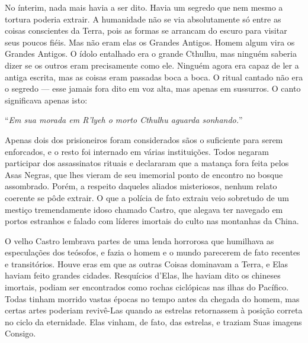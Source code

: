 No ínterim, nada mais havia a ser dito. Havia um segredo que nem mesmo a
tortura poderia extrair. A humanidade não se via absolutamente só entre
as coisas conscientes da Terra, pois as formas se arrancam do escuro
para visitar seus poucos fiéis. Mas não eram elas os Grandes Antigos.
Homem algum vira os Grandes Antigos. O ídolo entalhado era o grande
Cthulhu, mas ninguém saberia dizer se os outros eram precisamente como
ele. Ninguém agora era capaz de ler a antiga escrita, mas as coisas eram
passadas boca a boca. O ritual cantado não era o segredo --- esse jamais
fora dito em voz alta, mas apenas em sussurros. O canto significava
apenas isto:

``\emph{Em sua morada em R'lyeh o morto Cthulhu aguarda sonhando.}''

Apenas dois dos prisioneiros foram considerados sãos o suficiente para
serem enforcados, e o resto foi internado em várias instituições. Todos
negaram participar dos assassinatos rituais e declararam que a matança
fora feita pelos Asas Negras, que lhes vieram de seu imemorial ponto de
encontro no bosque assombrado. Porém, a respeito daqueles aliados
misteriosos, nenhum relato coerente se pôde extrair. O que a polícia de
fato extraiu veio sobretudo de um mestiço tremendamente idoso
chamado Castro, que alegava ter navegado em portos estranhos e falado com
líderes imortais do culto nas montanhas da China.

O velho Castro lembrava partes de uma lenda horrorosa que humilhava as
especulações dos teósofos, e fazia o homem e o mundo parecerem de fato
recentes e transitórios. Houve eras em que as outras Coisas dominavam a
Terra, e Elas haviam feito grandes cidades. Resquícios d'Elas, lhe
haviam dito os chineses imortais, podiam ser encontrados como rochas
ciclópicas nas ilhas do Pacífico. Todas tinham morrido vastas épocas no
tempo antes da chegada do homem, mas certas artes poderiam revivê-Las
quando as estrelas retornassem à posição correta no ciclo da
eternidade. Elas vinham, de fato, das estrelas, e traziam Suas imagens
Consigo.

